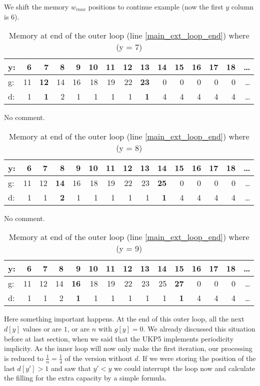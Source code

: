 \documentclass[12pt]{article}
\begin{document}
We shift the memory \(w_{max}\) positions to continue example (now the first \(y\) column is \(6\)). 

\begin{table}[H]
\centering
\caption{Memory at end of the outer loop (line \ref{main_ext_loop_end}) where (y = 7)}
\label{mem_y_7}
\begin{tabular}{l|rrrrrrrrrrrrrr}
y: & 6 &\textbf{7} &8 &9 &10 &11 &12 &\textbf{13} &14 &15 &16 &17 &18 &\dots\\
\hline
g: & 11 &\textbf{12} &14 &16 &18 &19 &22 &\textbf{23} &0 &0 &0 &0 &0 &\dots\\
d: & 1 & \textbf{1} & 2 & 1 & 1 & 1 & 1 & \textbf{1} & 4 & 4 & 4 & 4 & 4 & \dots\\
\end{tabular}
\end{table}

No comment.

\begin{table}[H]
\centering
\caption{Memory at end of the outer loop (line \ref{main_ext_loop_end}) where (y = 8)}
\label{mem_y_8}
\begin{tabular}{l|rrrrrrrrrrrrrr}
y: & 6 &7 &\textbf{8} &9 &10 &11 &12 &13 &\textbf{14} & 15 &16 &17 &18 &\dots\\
\hline
g: & 11 &12 &\textbf{14} &16 &18 &19 &22 &23 &\textbf{25} &0 &0 &0 &0 &\dots\\
d: & 1 & 1 & \textbf{2} & 1 & 1 & 1 & 1 & 1 & \textbf{1} & 4 & 4 & 4 & 4 & \dots\\
\end{tabular}
\end{table}

No comment.

\begin{table}[H]
\centering
\caption{Memory at end of the outer loop (line \ref{main_ext_loop_end}) where (y = 9)}
\label{mem_y_9}
\begin{tabular}{l|rrrrrrrrrrrrrr}
y: & 6 &7 &8 &\textbf{9} &10 &11 &12 &13 &14 &\textbf{15} &16 &17 &18 &\dots\\
\hline
g: & 11 &12 &14 &\textbf{16} &18 &19 &22 &23 &25 &\textbf{27} &0 &0 &0 &\dots\\
d: & 1 & 1 & 2 & \textbf{1} & 1 & 1 & 1 & 1 & 1 & \textbf{1} & 4 & 4 & 4 & \dots\\
\end{tabular}
\end{table}

Here something important happens. At the end of this outer loop, all the next \(d[y]\) values or are \(1\), or are \(n\) with \(g[y] = 0\). We already discussed this situation before at last section, when we said that the UKP5 implements periodicity implicity. As the inner loop will now only make the first iteration, our processing is reduced to \(\frac{1}{n} = \frac{1}{4}\) of the version without \(d\). If we were storing the position of the last \(d[y'] > 1\) and saw that \(y' < y\) we could interrupt the loop now and calculate the filling for the extra capacity by a simple formula.
\end{document}
